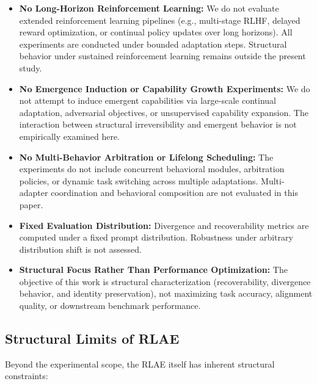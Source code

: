 \documentclass{article}
\begin{document}
	\begin{itemize}
		\item \textbf{No Long-Horizon Reinforcement Learning:}
		We do not evaluate extended reinforcement learning pipelines (e.g., multi-stage RLHF, delayed reward optimization, or continual policy updates over long horizons). All experiments are conducted under bounded adaptation steps. Structural behavior under sustained reinforcement learning remains outside the present study.
		
		\item \textbf{No Emergence Induction or Capability Growth Experiments:}
		We do not attempt to induce emergent capabilities via large-scale continual adaptation, adversarial objectives, or unsupervised capability expansion. The interaction between structural irreversibility and emergent behavior is not empirically examined here.
		
		\item \textbf{No Multi-Behavior Arbitration or Lifelong Scheduling:}
		The experiments do not include concurrent behavioral modules, arbitration policies, or dynamic task switching across multiple adaptations. Multi-adapter coordination and behavioral composition are not evaluated in this paper.
		
		\item \textbf{Fixed Evaluation Distribution:}
		Divergence and recoverability metrics are computed under a fixed prompt distribution. Robustness under arbitrary distribution shift is not assessed.
		
		\item \textbf{Structural Focus Rather Than Performance Optimization:}
		The objective of this work is structural characterization (recoverability, divergence behavior, and identity preservation), not maximizing task accuracy, alignment quality, or downstream benchmark performance.
	\end{itemize}
	
	\subsection{Structural Limits of RLAE}
	
	Beyond the experimental scope, the RLAE itself has inherent structural constraints:
	
\end{document}
